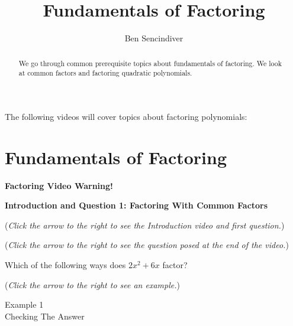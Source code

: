 \documentclass{ximera}
\title[Prerequisite Videos: ]{Fundamentals of Factoring}
\author{Ben Sencindiver}
\begin{document}
\begin{abstract}
  We go through common prerequisite topics about fundamentals of factoring. 
  We look at common factors and factoring quadratic polynomials.
\end{abstract}
\maketitle

The following videos will cover topics about factoring polynomials:

\section{Fundamentals of Factoring}
\textbf{Factoring Video Warning!}


\textbf{Introduction and Question 1: Factoring With Common Factors}
\begin{question}
\begin{flushright}
{\color{blue}(\emph{Click the arrow to the right to see the Introduction video and first question.})}
\end{flushright}
\begin{center}
\begin{expandable}
{\color{blue}(\emph{Click the arrow to the right to see the  question
posed at the end of the video.})}
\begin{expandable}
Which of the following ways does $2x^2 + 6x$ factor?
\begin{multipleChoice}
\end{multipleChoice}
\begin{flushright}
{\color{blue}(\emph{Click the arrow to the right to see an example.})}
\end{flushright}
\begin{expandable}
Example 1
\\

Checking The Answer
\end{expandable}
\end{expandable}
\end{expandable}
\end{center}
\end{question}
\end{document}
